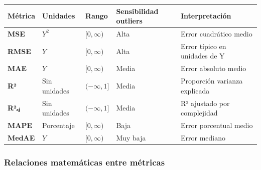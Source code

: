 \documentclass[
  doc,
  floatsintext,
  longtable,
  a4paper,
  nolmodern,
  notxfonts,
  notimes,
  12pt,
  colorlinks=true,linkcolor=blue,citecolor=blue,urlcolor=blue]{apa7}
\newcounter{none} %
\begin{document}
{\def\LTcaptype{none} %
\begin{longtable}[]{@{}
  >{\raggedright\arraybackslash}p{}
  >{\raggedright\arraybackslash}p{}
  >{\raggedright\arraybackslash}p{}
  >{\raggedright\arraybackslash}p{}
  >{\raggedright\arraybackslash}p{}@{}}
\toprule\noalign{}
\begin{minipage}[b]{\linewidth}\raggedright
Métrica
\end{minipage} & \begin{minipage}[b]{\linewidth}\raggedright
Unidades
\end{minipage} & \begin{minipage}[b]{\linewidth}\raggedright
Rango
\end{minipage} & \begin{minipage}[b]{\linewidth}\raggedright
Sensibilidad outliers
\end{minipage} & \begin{minipage}[b]{\linewidth}\raggedright
Interpretación
\end{minipage} \\
\midrule\noalign{}
\endhead
\bottomrule\noalign{}
\endlastfoot
\textbf{MSE} & \(Y^2\) & \([0, \infty)\) & Alta & Error cuadrático
medio \\
\textbf{RMSE} & \(Y\) & \([0, \infty)\) & Alta & Error típico en
unidades de Y \\
\textbf{MAE} & \(Y\) & \([0, \infty)\) & Media & Error absoluto medio \\
\textbf{R²} & Sin unidades & \((-\infty, 1]\) & Media & Proporción
varianza explicada \\
\textbf{R²ₐⱼ} & Sin unidades & \((-\infty, 1]\) & Media & R² ajustado
por complejidad \\
\textbf{MAPE} & Porcentaje & \([0, \infty)\) & Baja & Error porcentual
medio \\
\textbf{MedAE} & \(Y\) & \([0, \infty)\) & Muy baja & Error mediano \\
\end{longtable}
}

\subsubsection{Relaciones matemáticas entre
métricas}\label{relaciones-matemuxe1ticas-entre-muxe9tricas}
\end{document}
